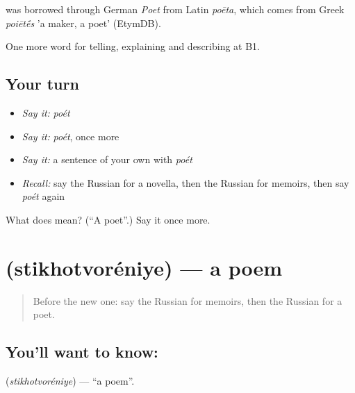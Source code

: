 \begin{cousinweb}
\emph{} was borrowed through German \emph{Poet} from Latin \emph{poēta}, which comes from Greek \emph{poiēt\'{\={e}}s} 'a maker, a poet' (EtymDB).
\end{cousinweb}

\begin{grammarlens}[title={What you've built}]
One more word for telling, explaining and describing at B1.
\end{grammarlens}

\subsection*{Your turn}
\begin{itemize}
\raggedright
  \item \emph{Say it:} \emph{poét}
  \item \emph{Say it:} \emph{poét}, once more
  \item \emph{Say it:} a sentence of your own with \emph{poét}
  \item \emph{Recall:} say the Russian for a novella, then the Russian for memoirs, then say \emph{poét} again
\end{itemize}

\begin{tcolorbox}[breakable,colback=teal!4,colframe=teal!35!black,title={Before you move on}]
What does  mean? (\textquotedblleft{}A poet\textquotedblright{}.) Say it once more.
\end{tcolorbox}
\section[\texorpdfstring{\ru{стихотворение} (stikhotvoréniye)}{стихотворение (stikhotvoréniye)}]{ (stikhotvoréniye) — a poem}

\label{lesson:RU-C525-stikhotvoreniye}



\begin{quote}
Before the new one: say the Russian for memoirs, then the Russian for a poet.
\end{quote}

\subsection*{You'll want to know: }
\textbf{} (\emph{stikhotvoréniye}) — \textquotedblleft{}a poem\textquotedblright{}.

